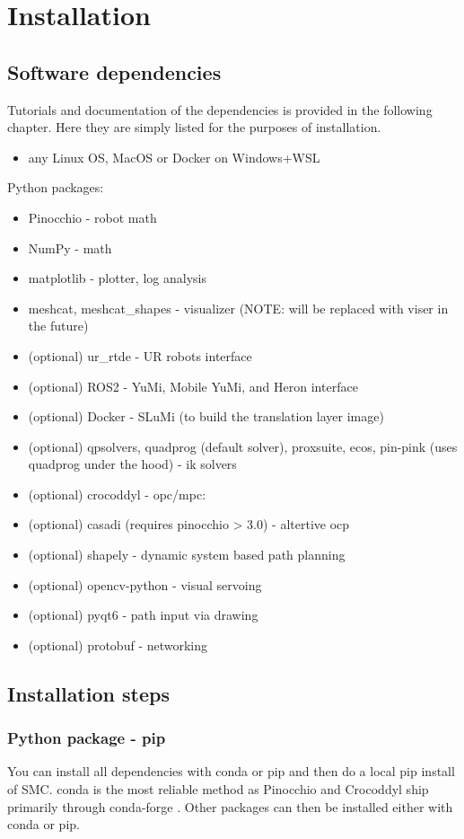 \chapter{Installation}
\section{Software dependencies}
Tutorials and documentation of the dependencies is
provided in the following chapter. Here they are simply
listed for the purposes of installation.
\begin{itemize}
\item any Linux OS, MacOS or Docker on Windows+WSL
\end{itemize}
Python packages:
\begin{itemize}
\item Pinocchio - robot math
\item NumPy - math
\item matplotlib - plotter, log analysis
\item meshcat, meshcat\_shapes - visualizer (NOTE: will be replaced with viser in the future)
\item (optional) ur\_rtde - UR robots interface 
\item (optional) ROS2 - YuMi, Mobile YuMi, and Heron interface
\item (optional) Docker - SLuMi (to build the translation layer image)
\item (optional)  qpsolvers, quadprog (default solver), proxsuite, ecos, pin-pink (uses quadprog under the hood) - ik solvers
\item (optional) crocoddyl - opc/mpc: 
\item (optional) casadi (requires pinocchio > 3.0) - altertive ocp 
\item (optional) shapely - dynamic system based path planning
\item (optional) opencv-python - visual servoing 
\item (optional) pyqt6 - path input via drawing
\item (optional) protobuf - networking
\end{itemize}

\section{Installation steps}
\subsection{Python package - pip}
You can install all 
dependencies with conda or pip and then do a local pip install of SMC.
conda is the most reliable method as Pinocchio and Crocoddyl
ship primarily through conda-forge
.
Other packages can then 
be installed either with conda or pip.

